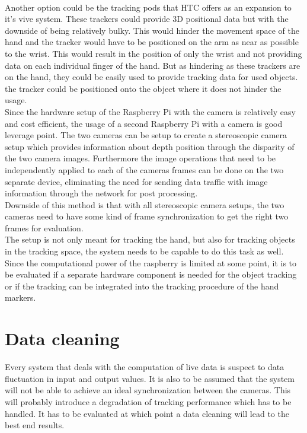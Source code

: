 \\Another option could be the tracking  pods that HTC offers as an expansion to it's vive system. These trackers could provide 3D positional data but with the downside of being relatively bulky. This would hinder the movement space of the hand and the tracker would have to be positioned on the arm as near as possible to the wrist. This would result in the position of only the wrist and not providing data on each individual finger of the hand. But as hindering as these trackers are on the hand, they could be easily used to provide tracking data for used objects. the tracker could be positioned onto the object where it does not hinder the usage. \\
Since the hardware setup of the Raspberry Pi with the camera is relatively easy and cost efficient, the usage of a second Raspberry Pi with a camera is good leverage point. The two cameras can be setup to create a stereoscopic camera setup which provides information about depth position through the disparity of the two camera images. 
Furthermore the image operations that need to be independently applied to each of the cameras frames can be done on the two separate device, eliminating the need for sending data traffic with image information through the network for post processing.
\\Downside of this method is that with all stereoscopic camera setups, the two cameras need to have some kind of frame synchronization to get the right two frames for evaluation.
\\The setup is not only meant for tracking the hand, but also for tracking objects in the tracking space, the system needs to be capable to do this task as well. Since the computational power of the raspberry is limited at some point, it is to be evaluated if a separate hardware component is needed for the object tracking or if the tracking can be integrated into the tracking procedure of the hand markers.\\%
\section{Data cleaning}
Every system that deals with the computation of live data is suspect to data fluctuation in input and output values. It is also to be assumed that the system will not be able to achieve an ideal synchronization between the cameras. This will probably introduce a degradation of tracking performance which has to be handled. It has to be evaluated at which point a data cleaning will lead to the best end results.
